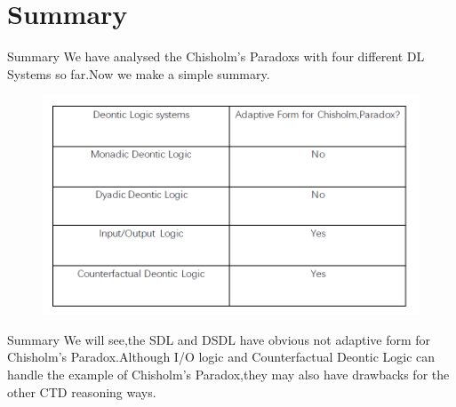 \documentclass{beamer}
\begin{document}
\section{Summary}
\begin{frame}{Summary}
We have analysed the Chisholm's Paradoxs with four different DL Systems so far.Now we make a simple summary.
\begin{figure}
\centering
\includegraphics[scale=0.5]{summary.png}

\label{fig_framework}
\end{figure}

    
\end{frame}
\begin{frame}{Summary}
   We will see,the SDL and DSDL have obvious not adaptive form for Chisholm's Paradox.Although I/O logic and Counterfactual Deontic Logic can handle the example of Chisholm's Paradox,they may also have drawbacks for the other CTD reasoning ways. 
\end{frame}
\end{document}
